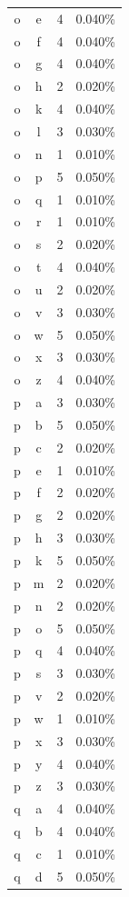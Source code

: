 \begin{longtable}{cccc}
    o & e & 4 & 0.040\% \\
    o & f & 4 & 0.040\% \\
    o & g & 4 & 0.040\% \\
    o & h & 2 & 0.020\% \\
    o & k & 4 & 0.040\% \\
    o & l & 3 & 0.030\% \\
    o & n & 1 & 0.010\% \\
    o & p & 5 & 0.050\% \\
    o & q & 1 & 0.010\% \\
    o & r & 1 & 0.010\% \\
    o & s & 2 & 0.020\% \\
    o & t & 4 & 0.040\% \\
    o & u & 2 & 0.020\% \\
    o & v & 3 & 0.030\% \\
    o & w & 5 & 0.050\% \\
    o & x & 3 & 0.030\% \\
    o & z & 4 & 0.040\% \\
    p & a & 3 & 0.030\% \\
    p & b & 5 & 0.050\% \\
    p & c & 2 & 0.020\% \\
    p & e & 1 & 0.010\% \\
    p & f & 2 & 0.020\% \\
    p & g & 2 & 0.020\% \\
    p & h & 3 & 0.030\% \\
    p & k & 5 & 0.050\% \\
    p & m & 2 & 0.020\% \\
    p & n & 2 & 0.020\% \\
    p & o & 5 & 0.050\% \\
    p & q & 4 & 0.040\% \\
    p & s & 3 & 0.030\% \\
    p & v & 2 & 0.020\% \\
    p & w & 1 & 0.010\% \\
    p & x & 3 & 0.030\% \\
    p & y & 4 & 0.040\% \\
    p & z & 3 & 0.030\% \\
    q & a & 4 & 0.040\% \\
    q & b & 4 & 0.040\% \\
    q & c & 1 & 0.010\% \\
    q & d & 5 & 0.050\% \\

\end{longtable}
